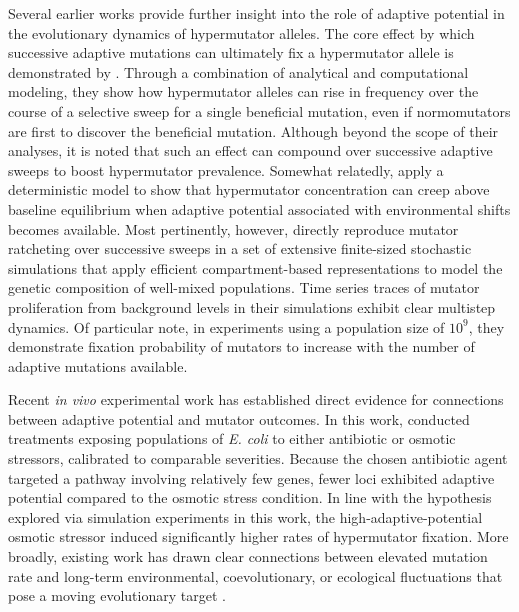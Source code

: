Several earlier works provide further insight into the role of adaptive potential in the evolutionary dynamics of hypermutator alleles.
The core effect by which successive adaptive mutations can ultimately fix a hypermutator allele is demonstrated by \citet{tanaka2003evolution}.
Through a combination of analytical and computational modeling, they show how hypermutator alleles can rise in frequency over the course of a selective sweep for a single beneficial mutation, even if normomutators are first to discover the beneficial mutation.
Although beyond the scope of their analyses, it is noted that such an effect can compound over successive adaptive sweeps to boost hypermutator prevalence.
Somewhat relatedly, \citet{travis2002mutator} apply a deterministic model to show that hypermutator concentration can creep above baseline equilibrium when adaptive potential associated with environmental shifts becomes available.
Most pertinently, however, \citet{tenaillon1999mutators} directly reproduce mutator ratcheting over successive sweeps in a set of extensive finite-sized stochastic simulations that apply efficient compartment-based representations to model the genetic composition of well-mixed populations.
Time series traces of mutator proliferation from background levels in their simulations exhibit clear multistep dynamics.
Of particular note, in experiments using a population size of $10^9$, they demonstrate fixation probability of mutators to increase with the number of adaptive mutations available.

Recent \textit{in vivo} experimental work has established direct evidence for connections between adaptive potential and mutator outcomes.
In this work, \citet{callens2023hypermutator} conducted treatments exposing populations of \textit{E. coli} to either antibiotic or osmotic stressors, calibrated to comparable severities.
Because the chosen antibiotic agent targeted a pathway involving relatively few genes, fewer loci exhibited adaptive potential compared to the osmotic stress condition.
In line with the hypothesis explored via simulation experiments in this work, the high-adaptive-potential osmotic stressor induced significantly higher rates of hypermutator fixation.
More broadly, existing work has drawn clear connections between elevated mutation rate and long-term environmental, coevolutionary, or ecological fluctuations that pose a moving evolutionary target \citep{leigh1970natural,travis2002mutator,travis2004mutators,rosenbloom2014frequencydependent,pal2007coevolution,wei2022rapid}.


